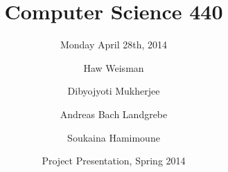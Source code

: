 \documentclass{beamer}
\title[Crisis] %
{Computer Science 440}
\subtitle{Monday April 28th, 2014}
\author[Hawk Weisman, Dibyojyoti Mukherjee, Andreas Bach Landgrebe, Soukaina Hamimoune] %
{Haw Weisman\inst{1} \and Dibyojyoti Mukherjee\inst{1}\\ \and Andreas Bach Landgrebe\inst{1} \and Soukaina Hamimoune\inst{2}}
\institute[Allegheny College, Department of Computer Science] %
{
  \inst{1}%
  Allgheny College\\
  Department of Computer Science
  \and
  \inst{2}%
  Al Akhawayn University\\
  Department of Computer Science
}
\date[April 28, 2014] %
{Project Presentation, Spring 2014}
\begin{document}
\frame{\titlepage}
\end{document}

